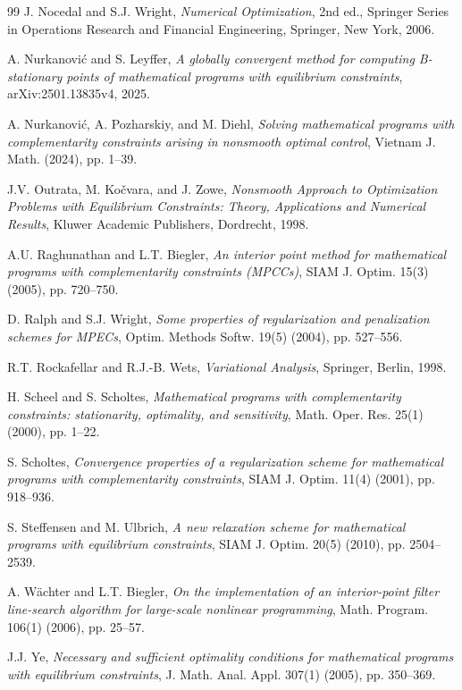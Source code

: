 \begin{thebibliography}{99}
J. Nocedal and S.J. Wright, \emph{Numerical Optimization}, 2nd ed.,
Springer Series in Operations Research and Financial Engineering,
Springer, New York, 2006.


A. Nurkanovi\'{c} and S. Leyffer, \emph{A globally convergent method
for computing B-stationary points of mathematical programs with
equilibrium constraints}, arXiv:2501.13835v4, 2025.


A. Nurkanovi\'{c}, A. Pozharskiy, and M. Diehl, \emph{Solving
mathematical programs with complementarity constraints arising in
nonsmooth optimal control}, Vietnam J. Math. (2024), pp. 1--39.


J.V. Outrata, M. Ko\v{c}vara, and J. Zowe, \emph{Nonsmooth Approach to
Optimization Problems with Equilibrium Constraints: Theory, Applications
and Numerical Results}, Kluwer Academic Publishers, Dordrecht, 1998.


A.U. Raghunathan and L.T. Biegler, \emph{An interior point method for
mathematical programs with complementarity constraints (MPCCs)},
SIAM J. Optim. 15(3) (2005), pp. 720--750.


D. Ralph and S.J. Wright, \emph{Some properties of regularization and
penalization schemes for MPECs}, Optim. Methods Softw. 19(5) (2004),
pp. 527--556.


R.T. Rockafellar and R.J.-B. Wets, \emph{Variational Analysis},
Springer, Berlin, 1998.


H. Scheel and S. Scholtes, \emph{Mathematical programs with
complementarity constraints: stationarity, optimality, and sensitivity},
Math. Oper. Res. 25(1) (2000), pp. 1--22.


S. Scholtes, \emph{Convergence properties of a regularization scheme
for mathematical programs with complementarity constraints},
SIAM J. Optim. 11(4) (2001), pp. 918--936.


S. Steffensen and M. Ulbrich, \emph{A new relaxation scheme for
mathematical programs with equilibrium constraints},
SIAM J. Optim. 20(5) (2010), pp. 2504--2539.


A. W\"{a}chter and L.T. Biegler, \emph{On the implementation of an
interior-point filter line-search algorithm for large-scale nonlinear
programming}, Math. Program. 106(1) (2006), pp. 25--57.


J.J. Ye, \emph{Necessary and sufficient optimality conditions for
mathematical programs with equilibrium constraints},
J. Math. Anal. Appl. 307(1) (2005), pp. 350--369.


\end{thebibliography}
